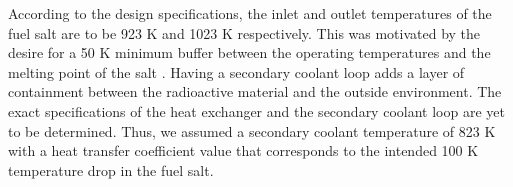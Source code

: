 According to the design specifications, the inlet and outlet temperatures of
the fuel salt are to be 923 K and 1023 K respectively. This was motivated by
the desire for a 50 K minimum buffer between the operating temperatures
and the melting point of the salt \cite{euratom_final_2015}.
Having a secondary coolant loop adds a layer of containment between the
radioactive material and the outside environment. The exact specifications of
the heat exchanger and the secondary coolant loop are yet to be determined.
Thus, we assumed a secondary coolant temperature of 823 K with a heat transfer
coefficient value that corresponds to the intended 100 K temperature drop in
the fuel salt.
